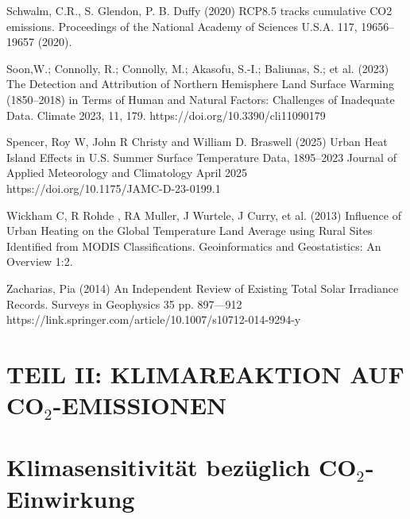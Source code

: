 \documentclass[12pt,paper=a4,DIV=12,parskip=never,chapterprefix=false,headings=standardclasses]{scrreprt}
\numberwithin{figure}{chapter}
\begin{document}
Schwalm, C.R., S. Glendon, P. B. Duffy (2020) RCP8.5 tracks cumulative CO2 emissions. Proceedings of
the National Academy of Sciences U.S.A. 117, 19656–19657 (2020).

Soon,W.; Connolly, R.; Connolly, M.; Akasofu, S.-I.; Baliunas, S.; et al. (2023) The Detection and
Attribution of Northern Hemisphere Land Surface Warming (1850–2018) in Terms of Human and
Natural Factors: Challenges of Inadequate Data. Climate 2023, 11, 179.
https://doi.org/10.3390/cli11090179

Spencer, Roy W, John R Christy and William D. Braswell (2025) Urban Heat Island Effects in U.S.
Summer Surface Temperature Data, 1895–2023 Journal of Applied Meteorology and Climatology
April 2025 https://doi.org/10.1175/JAMC-D-23-0199.1

Wickham C, R Rohde , RA Muller, J Wurtele, J Curry, et al. (2013) Influence of Urban Heating on the
Global Temperature Land Average using Rural Sites Identified from MODIS Classifications.
Geoinformatics and Geostatistics: An Overview 1:2.

Zacharias, Pia (2014) An Independent Review of Existing Total Solar Irradiance Records. Surveys in
Geophysics 35 pp. 897—912 https://link.springer.com/article/10.1007/s10712-014-9294-y

\cleardoublepage
\chapter*{TEIL II: KLIMAREAKTION AUF CO$_2$-EMISSIONEN}
\cleardoublepage
\chapter{Klimasensitivität bezüglich CO$_2$-Einwirkung}
\end{document}
